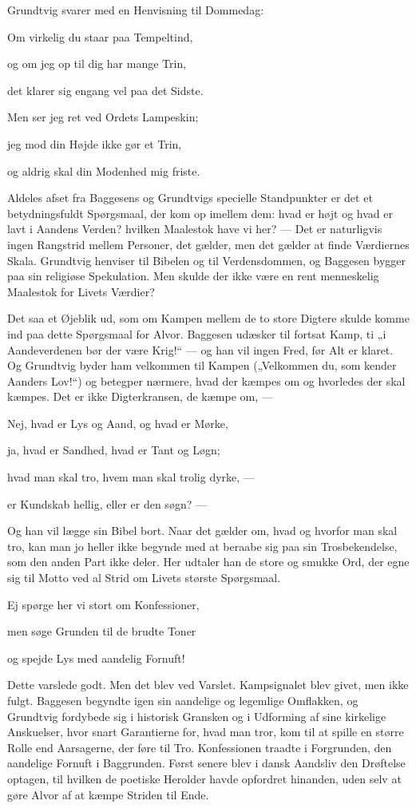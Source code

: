 \documentclass[12pt,a4paper,openany]{book}
\newcommand{\opage}[1]{\marginnote{\footnotesize\textit{[#1]}}}
\begin{document}
Grundtvig svarer med en Henvisning til Dommedag:

Om virkelig du staar paa Tempeltind,

og om jeg op til dig har mange Trin,

det klarer sig engang vel paa det Sidste.

\setcounter{footnote}{0}%
\opage{71}Men ser jeg ret ved Ordets Lampeskin;

jeg mod din Højde ikke gør et Trin,

og aldrig skal din Modenhed mig friste.

Aldeles afset fra Baggesens og Grundtvigs specielle Standpunkter er det et
betydningsfuldt Spørgsmaal, der kom op imellem dem: hvad er højt og hvad er
lavt i Aandens Verden? hvilken Maalestok have vi her? --- Det er naturligvis
ingen Rangstrid mellem Personer, det gælder, men det gælder at finde Værdiernes
Skala. Grundtvig henviser til Bibelen og til Verdensdommen, og Baggesen bygger
paa sin religiøse Spekulation. Men skulde der ikke være en rent menneskelig
Maalestok for Livets Værdier?

Det saa et Øjeblik ud, som om Kampen mellem de to store Digtere skulde komme
ind paa dette Spørgsmaal for Alvor. Baggesen udæsker til fortsat Kamp, ti „i
Aandeverdenen bør der være Krig!“ --- og han vil ingen Fred, før Alt er klaret.
Og Grundtvig byder ham velkommen til Kampen („Velkommen du, som kender Aanders
Lov!“) og betegper nærmere, hvad der kæmpes om og hvorledes der skal kæmpes.
Det er ikke Digterkransen, de kæmpe om, ---

Nej, hvad er Lys og Aand, og hvad er Mørke,

ja, hvad er Sandhed, hvad er Tant og Løgn;

hvad man skal tro, hvem man skal trolig dyrke, ---

er Kundskab hellig, eller er den søgn? ---

Og han vil lægge sin Bibel bort. Naar det gælder om, hvad og hvorfor man skal
tro, kan man jo heller ikke begynde med at beraabe sig paa sin Trosbekendelse,
som den anden Part ikke deler. Her udtaler han de store og smukke Ord, der egne
sig til Motto ved al Strid om Livets største Spørgsmaal.

Ej spørge her vi stort om Konfessioner,

men søge Grunden til de brudte Toner

og spejde Lys med aandelig Fornuft!

\setcounter{footnote}{0}%
\opage{72}Dette varslede godt. Men det blev ved Varslet. Kampsignalet blev
givet, men ikke fulgt. Baggesen begyndte igen sin aandelige og legemlige
Omflakken, og Grundtvig fordybede sig i historisk Gransken og i Udforming af
sine kirkelige Anskuelser, hvor snart Garantierne for, hvad man tror, kom til
at spille en større Rolle end Aarsagerne, der føre til Tro. Konfessionen
traadte i Forgrunden, den aandelige Fornuft i Baggrunden. Først senere blev i
dansk Aandsliv den Drøftelse optagen, til hvilken de poetiske Herolder havde
opfordret hinanden, uden selv at gøre Alvor af at kæmpe Striden til Ende.
\end{document}
